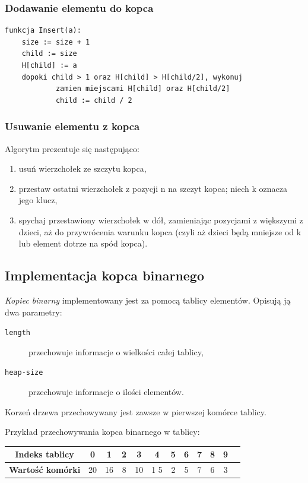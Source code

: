 \documentclass[12pt,a4paper]{article}
\begin{document}
\subsubsection{Dodawanie elementu do kopca}

\begin{lstlisting}[caption=Pseudokod algorytmu dodawania elementów do kopca]
funkcja Insert(a):
    size := size + 1
    child := size
    H[child] := a
    dopoki child > 1 oraz H[child] > H[child/2], wykonuj
            zamien miejscami H[child] oraz H[child/2]
            child := child / 2
\end{lstlisting}

\subsubsection{Usuwanie elementu z kopca}

Algorytm prezentuje się następująco:

\begin{enumerate}
	\item usuń wierzchołek ze szczytu kopca,
	\item przestaw ostatni wierzchołek z pozycji n na szczyt kopca; niech k oznacza jego klucz,
	\item spychaj przestawiony wierzchołek w dół, zamieniając pozycjami z większymi z dzieci, aż do przywrócenia warunku kopca (czyli aż dzieci będą mniejsze od k lub element dotrze na spód kopca).
\end{enumerate}

\subsection{Implementacja kopca binarnego}

\textit{Kopiec binarny} implementowany jest za pomocą tablicy elementów. Opisują ją dwa parametry: 

\begin{description}
	\item [\texttt{length}] przechowuje informacje o wielkości całej tablicy, 
	\item [\texttt{heap-size}] przechowuje informacje o ilości elementów. 
\end{description}

Korzeń drzewa przechowywany jest zawsze w pierwszej komórce tablicy. 

Przykład przechowywania kopca binarnego w tablicy:

\vspace{5pt}
\begin{tabular}{| c | c | c | c | c | c | c | c | c | c | c | c | }
	\hline
	\textbf{Indeks tablicy} & 0 & 1 & 2 & 3 & 4 & 5 & 6 & 7 & 8 & 9	\\
	\hline
	\textbf{Wartość komórki} & 20	& 16 & 8 & 10 & 1 5 & 2 & 5 & 7 & 6 & 3 \\
	\hline
	\end{tabular}
\vspace{5pt}
\end{document}
